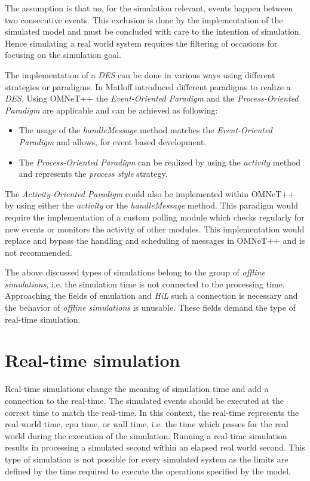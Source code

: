 The assumption is that no, for the simulation relevant, events happen between two consecutive events.
This exclusion is done by the implementation of the simulated model and must be concluded with care to the intention of simulation.
Hence simulating a real world system requires the filtering of occasions for focusing on the simulation goal. \cite[section 4.1.1]{omnet_manual}

The implementation of a \emph{DES} can be done in various ways using different strategies or paradigms.
In \cite[chapter 2]{matloff_introduction_2008} Matloff introduced different paradigms to realize a \emph{DES}.
Using OMNeT++ the \emph{Event-Oriented Paradigm} and the \emph{Process-Oriented Paradigm} are applicable and can be achieved as following:

\begin{itemize}
    \item The usage of the \emph{handleMessage} method matches the \emph{Event-Oriented Paradigm} and allows, for event based development.
    \item The \emph{Process-Oriented Paradigm} can be realized by using the \emph{activity} method and represents the \emph{process style} strategy.
\end{itemize}

\begin{sloppypar}
The \emph{Activity-Oriented Paradigm} could also be implemented within OMNeT++ by using either the \emph{activity} or the \emph{handleMessage} method.
This paradigm would require the implementation of a custom polling module which checks regularly for new events or monitors the activity of other modules.
This implementation would replace and bypass the handling and scheduling of messages in OMNeT++ and is not recommended. \cite[chapter 2.1]{matloff_introduction_2008}
\\
\end{sloppypar}

The above discussed types of simulations belong to the group of \emph{offline simulations}, i.e. the simulation time is not connected to the processing time.
Approaching the fields of emulation and \emph{HiL} such a connection is necessary and the behavior of \emph{offline simulations} is unusable.
These fields demand the type of real-time simulation.  \cite[section III.B]{belanger_what_2010}

\section{Real-time simulation}
\label{sec:simulation_real_time}
Real-time simulations change the meaning of simulation time and add a connection to the real-time.
The simulated events should be executed at the correct time to match the real-time.
In this context, the real-time represents the real world time, cpu time, or wall time, i.e. the time which passes for the real world during the execution of the simulation.
Running a real-time simulation results in processing a simulated second within an elapsed real world second.
This type of simulation is not possible for every simulated system as the limits are defined by the time required to execute the operations specified by the model.

